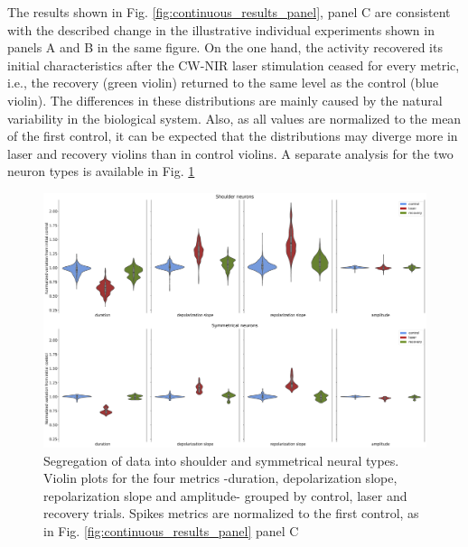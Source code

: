 The results shown in Fig. \ref{fig:continuous_results_panel}, panel C are consistent with the described change in the illustrative individual experiments shown in panels A and B in the same figure. On the one hand, the activity recovered its initial characteristics after the CW-NIR laser stimulation ceased for every metric, i.e., the recovery (green violin) returned to the same level as the control (blue violin). The differences in these distributions are mainly caused by the natural variability in the biological system. Also, as all values are normalized to the mean of the first control, it can be expected that the distributions may diverge more in laser and recovery violins than in control violins. A separate analysis for the two neuron types is available in Fig. \ref{fig:continuous panel s1}

\begin{figure}
	\includegraphics[width=\textwidth]{img/laser/FigureS1.eps}
	\caption{Segregation of data into shoulder and symmetrical neural types. Violin plots for the four metrics -duration, depolarization slope, repolarization slope and amplitude- grouped by control, laser and recovery trials. Spikes metrics are normalized to the first control, as in Fig. \ref{fig:continuous_results_panel} panel C}
	\label{fig:continuous panel s1}
\end{figure}

